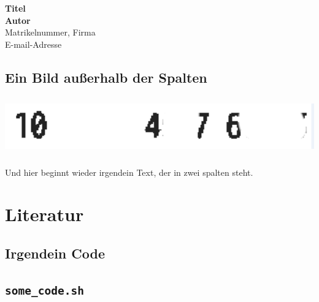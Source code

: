 \documentclass[a4paper, german, 10pt]{extarticle}
\begin{document}
\begin{center}
	\textbf{\Large{Titel}}\\
	\vspace{0.5cm}
	\textbf{\large{Autor}}\\
	\vspace{0.2cm}
	\large{Matrikelnummer, Firma}\\
	\vspace{0.2cm}
	\large{E-mail-Adresse}\\
	\vspace{0.8cm}
\end{center}

\begin{multicols}{2}

\cite{beispiel}
\small

\normalsize
\tableofcontents



\end{multicols}
\subsection{Ein Bild au{\ss}erhalb der Spalten}
\par\medskip\noindent\minipage{\linewidth}
\centering
\begin{minipage}[b]{\textwidth}
    \centering
    \includegraphics[height=2.5cm, fbox]{image3.png}
    \label{fig:someimage}
\end{minipage}
\endminipage\par\medskip


\begin{multicols}{2}
Und hier beginnt wieder irgendein Text, der in zwei spalten steht.
\section{Literatur}



\end{multicols}

\clearpage


\def\appendixname{Anhang}
\def\appendixpagename{Appendix}

\begin{appendices}
    \appendixpage
    \section{Irgendein Code}
    \subsection{\texttt{some\_code.sh}}
    
\end{appendices}
\end{document}
